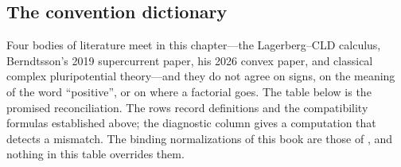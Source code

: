 \subsection{The convention dictionary}
\label{sec:ch14-convention-dictionary}

Four bodies of literature meet in this chapter---the Lagerberg--CLD calculus,
Berndtsson's 2019 supercurrent paper, his 2026 convex paper, and classical
complex pluripotential theory---and they do not agree on signs, on the
meaning of the word ``positive'', or on where a factorial goes.  The table
below is the promised reconciliation.  The rows record definitions and the compatibility formulas established
above; the diagnostic column gives a computation that detects a mismatch.
The binding normalizations of this book are those of
, and nothing in this table overrides
them.

